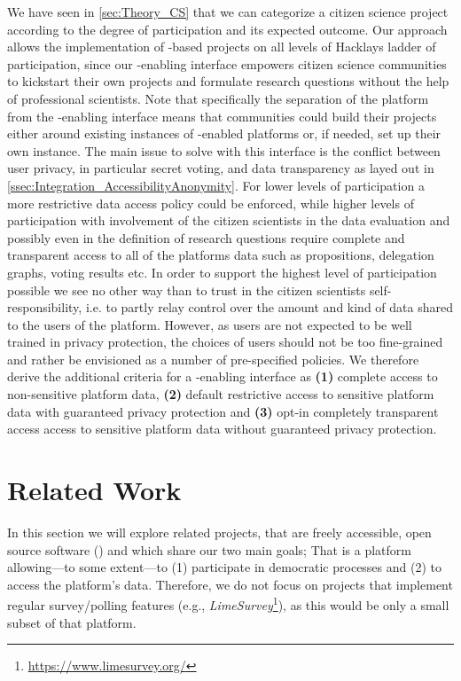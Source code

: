 We have seen in \ref{sec:Theory_CS} that we can categorize a citizen science project according to the degree of participation and its expected outcome.
Our approach allows the implementation of -based  projects on all levels of Hacklays ladder of participation, since our -enabling interface empowers citizen science communities to kickstart their own projects and formulate research questions without the help of professional scientists.
Note that specifically the separation of the  platform from the -enabling interface means that communities could build their  projects either around existing instances of -enabled  platforms or, if needed, set up their own instance.
The main issue to solve with this interface is the conflict between user privacy, in particular secret voting, and data transparency as layed out in \ref{ssec:Integration_AccessibilityAnonymity}.
For lower levels of participation a more restrictive data access policy could be enforced, while higher levels of participation with involvement of the citizen scientists in the data evaluation and possibly even in the definition of research questions require complete and transparent access to all of the platforms data such as propositions, delegation graphs, voting results etc.
In order to support the highest level of participation possible we see no other way than to trust in the citizen scientists self-responsibility, i.e. to partly relay control over the amount and kind of data shared to the users of the  platform.
However, as users are not expected to be well trained in privacy protection, the choices of users should not be too fine-grained and rather be envisioned as a number of pre-specified policies.
We therefore derive the additional criteria for a -enabling interface as \textbf{(1)} complete access to non-sensitive platform data, \textbf{(2)} default restrictive access to sensitive platform data with guaranteed privacy protection and \textbf{(3)} opt-in completely transparent access access to sensitive platform data without guaranteed privacy protection.

\section{Related Work}
\label{sec:RelatedWork}
  
In this section we will explore related projects, that are freely accessible, open source software () and which share our two main goals; That is a platform allowing---to some extent---to (1) participate in democratic processes and (2) to access the platform’s data. Therefore, we do not focus on projects that implement regular survey/polling features (e.g., \textit{LimeSurvey}\footnote{\url{https://www.limesurvey.org/}}), as this would be only a small subset of that platform.

